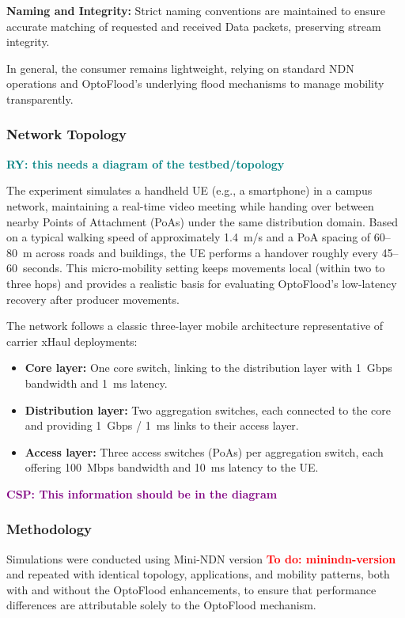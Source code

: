 \documentclass[10pt,conference]{IEEEtran}
\newcommand{\todo}[1]{\textbf{\textcolor{red}{To do: #1}}}
\newcommand{\csp}[1]{\textbf{\textcolor{purple}{CSP: #1}}}
\newcommand{\ryo}[1]{\textbf{\textcolor{teal}{RY: #1}}}
\begin{document}
\textbf{Naming and Integrity:}
Strict naming conventions are maintained to ensure accurate matching of requested and received Data packets, preserving stream integrity.

In general, the consumer remains lightweight, relying on standard NDN operations and OptoFlood’s underlying flood mechanisms to manage mobility transparently.

\subsubsection{Network Topology}
\ryo{this needs a diagram of the testbed/topology}

The experiment simulates a handheld UE (e.g., a smartphone) in a campus network, maintaining a real-time video meeting while handing over between nearby Points of Attachment (PoAs) under the same distribution domain. Based on a typical walking speed of approximately 1.4~m/s and a PoA spacing of 60--80~m across roads and buildings, the UE performs a handover roughly every 45--60~seconds. This micro-mobility setting keeps movements local (within two to three hops) and provides a realistic basis for evaluating OptoFlood’s low-latency recovery after producer movements.

The network follows a classic three-layer mobile architecture representative of carrier xHaul deployments:
\begin{itemize}
    \item \textbf{Core layer:} One core switch, linking to the distribution layer with 1~Gbps bandwidth and 1~ms latency.
    \item \textbf{Distribution layer:} Two aggregation switches, each connected to the core and providing 1~Gbps / 1~ms links to their access layer.
    \item \textbf{Access layer:} Three access switches (PoAs) per aggregation switch, each offering 100~Mbps bandwidth and 10~ms latency to the UE.
\end{itemize}
\csp{This information should be in the diagram}

\subsubsection{Methodology}

Simulations were conducted using Mini-NDN version \todo{minindn-version} \cite{FIXME} and repeated with identical topology, applications, and mobility patterns, both with and without the OptoFlood enhancements, to ensure that performance differences are attributable solely to the OptoFlood mechanism.
\end{document}
